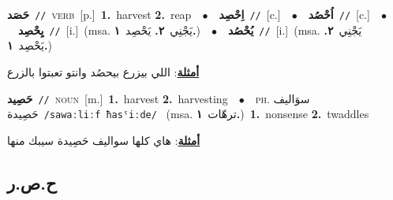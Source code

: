 \documentclass[10pt,a4paper,twoside]{article} %
\begin{document}
\begin{multicols}{2}
{\setlength\topsep{0pt}\textbf{\foreignlanguage{arabic}{حَصَد}}\ {\color{gray}\texttt{//}\color{black}}\ \textsc{verb}\ [p.]\ \textbf{1.}~harvest  \textbf{2.}~reap\ \ $\bullet$\ \ \setlength\topsep{0pt}\textbf{\foreignlanguage{arabic}{اِحْصِد}}\ {\color{gray}\texttt{//}\color{black}}\ [c.]\ \ $\bullet$\ \ \setlength\topsep{0pt}\textbf{\foreignlanguage{arabic}{اُحْصُد}}\ {\color{gray}\texttt{//}\color{black}}\ [c.]\ \ $\bullet$\ \ \setlength\topsep{0pt}\textbf{\foreignlanguage{arabic}{يِحْصِد}}\ {\color{gray}\texttt{//}\color{black}}\ [i.]\ \color{gray}(msa. \foreignlanguage{arabic}{يَجْنِي}~\foreignlanguage{arabic}{\textbf{٢.}}  \foreignlanguage{arabic}{يَحْصِد}~\foreignlanguage{arabic}{\textbf{١.}})\color{black}\ \ $\bullet$\ \ \setlength\topsep{0pt}\textbf{\foreignlanguage{arabic}{يُحْصُد}}\ {\color{gray}\texttt{//}\color{black}}\ [i.]\ \color{gray}(msa. \foreignlanguage{arabic}{يَجْنِي}~\foreignlanguage{arabic}{\textbf{٢.}}  \foreignlanguage{arabic}{يَحْصِد}~\foreignlanguage{arabic}{\textbf{١.}})\color{black}\  \begin{flushright}\color{gray}\foreignlanguage{arabic}{\textbf{\underline{\foreignlanguage{arabic}{أمثلة}}}: اللي بيزرع بيحصُد وانتو تعبتوا بالزرع}\end{flushright}\color{black}} \vspace{2mm}

{\setlength\topsep{0pt}\textbf{\foreignlanguage{arabic}{حَصِيد}}\ {\color{gray}\texttt{//}\color{black}}\ \textsc{noun}\ [m.]\ \textbf{1.}~harvest  \textbf{2.}~harvesting\ \ $\bullet$\ \ \textsc{ph.} \color{gray} \foreignlanguage{arabic}{سوَاليف حَصِيدة}\color{black}\ {\color{gray}\texttt{/{\sffamily sawaːliːf ħasˤiːde}/}\color{black}}\ \color{gray} (msa. \foreignlanguage{arabic}{ترهّات}~\foreignlanguage{arabic}{\textbf{١.}})\color{black}\ \textbf{1.}~nonsense  \textbf{2.}~twaddles\  \begin{flushright}\color{gray}\foreignlanguage{arabic}{\textbf{\underline{\foreignlanguage{arabic}{أمثلة}}}: هاي كلها سواليف حَصِيدة سيبك منها}\end{flushright}\color{black}} \vspace{2mm}

\vspace{-3mm}
\subsection*{\color{blue}\foreignlanguage{arabic}{ح.ص.ر}\color{blue}{}} 


\end{multicols}
\end{document}
